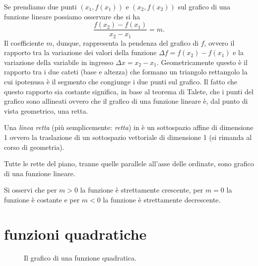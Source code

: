 Se prendiamo due punti $(x_1,f(x_1))$
e $(x_2,f(x_2))$ sul grafico di una funzione lineare
possiamo osservare che si ha
\[
  \frac{f(x_2) - f(x_1)}{x_2 - x_1} = m.
\]
Il coefficiente $m$, dunque, rappresenta la pendenza del
grafico di $f$, ovvero il rapporto tra la variazione
dei valori della funzione $\Delta f = f(x_2) - f(x_1)$
e la variazione della variabile in ingresso
$\Delta x = x_2 - x_1$.
Geometricamente questo è il rapporto tra i due cateti
(base e altezza) che formano un triangolo rettangolo la
cui ipotenusa è il segmento che congiunge i due punti sul grafico.
Il fatto che questo rapporto sia costante significa,
in base al teorema di Talete, che i punti del grafico sono
allineati ovvero che il grafico di una funzione lineare è,
dal punto di vista geometrico, una retta.

\begin{definition}[retta]
  Una \emph{linea retta} (più semplicemente: \emph{retta}) in è un sottospazio affine di dimensione 1 
  ovvero la traslazione di un sottospazio vettoriale di dimensione 1
  (si rimanda al corso di geometria).
\end{definition}

Tutte le rette del piano, 
tranne quelle parallele all'asse delle ordinate,
sono grafico di una funzione lineare.

Si osservi che per $m>0$ la funzione è strettamente crescente,
per $m=0$ la funzione è costante e per $m<0$ la funzione è
strettamente decrescente.

\section{funzioni quadratiche}

\begin{figure}
  \begin{center}
  \end{center}
  \caption{Il grafico di una funzione quadratica.}
  \label{fig:funzione_quadratica}
\end{figure}

